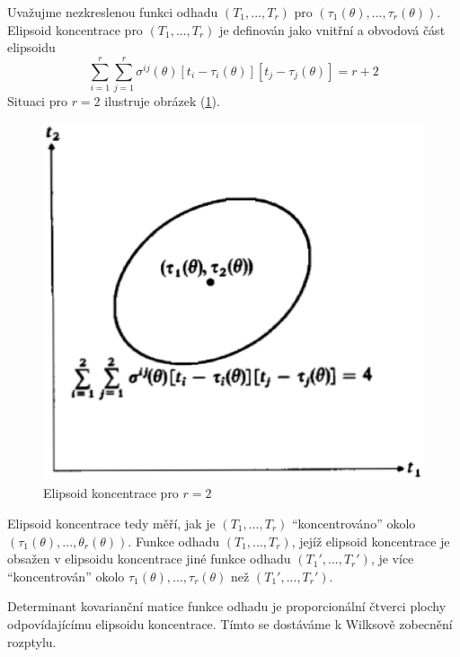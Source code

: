 \begin{definition}
Uvažujme nezkreslenou funkci odhadu $(T_1, ..., T_r)$ pro $(\tau_1(\theta), ..., \tau_r(\theta))$. Elipsoid koncentrace pro $(T_1, ..., T_r)$ je definován jako vnitřní a obvodová část elipsoidu
\begin{equation*}
\sum_{i = 1}^r \sum_{j = 1}^r \sigma^{ij}(\theta)[t_i - \tau_i(\theta)][t_j - \tau_j(\theta)] = r + 2
\end{equation*}
Situaci pro $r = 2$ ilustruje obrázek (\ref{ellipsoid-of-concentration}).
\end{definition}

\begin{figure}[htp]
\centering
\includegraphics[scale = 0.5]{pictures/ellipsoid_of_concentration.eps}
\caption{Elipsoid koncentrace pro $r = 2$}
\label{ellipsoid-of-concentration}
\end{figure}

Elipsoid koncentrace tedy měří, jak je $(T_1, ..., T_r)$ ``koncentrováno'' okolo $(\tau_1(\theta), ..., \theta_r(\theta))$. Funkce odhadu $(T_1, ..., T_r)$, jejíž elipsoid koncentrace je obsažen v elipsoidu koncentrace jiné funkce odhadu $(T_1', ..., T_r')$, je více ``koncentrován'' okolo $\tau_1(\theta), ..., \tau_r(\theta)$ než $(T_1', ..., T_r')$.

Determinant kovarianční matice funkce odhadu je proporcionální čtverci plochy odpovídajícímu elipsoidu koncentrace. Tímto se dostáváme k Wilksově zobecnění rozptylu.

